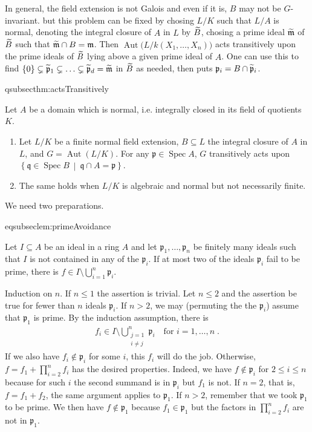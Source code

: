 \documentclass[DIV=14,parskip=full,pointednumbers]{scrartcl}
\newenvironment{alphanumerate}{\begin{enumerate}[label={$(\alph*)$},ref=\curthm]}{\end{enumerate}}
\theoremstyle{cthm}
\theoremstyle{cvarthm}
\renewenvironment{proof}[1][\proofname]
{\pushQED{\qed}\topsep0pt \partopsep0pt\trivlist\item[\hskip\labelsep\itshape #1.] }{\popQED\endtrivlist\addvspace{6pt plus 6pt}}
\theoremstyle{cdef}
\newcommand{\lbl}[1]{
	\label{#1}
	\ifmmode
	\expandafter\xdef\csname eqsubsec#1\endcsname{\thesubsection}
	\fi
}
\newcommand{\mm}{\mathfrak{m}}
\newcommand{\pp}{\mathfrak{p}}
\newcommand{\qq}{\mathfrak{q}}
\newcommand{\Aut}{\operatorname{Aut}}
\newcommand{\Spec}{\operatorname{Spec}}
\newcommand{\snake}[1]{\widetilde{#1}\vphantom{\overrightarrow{#1}}}%
\newcommand{\st}{\ \middle|\ }
\begin{document}
	In general, the field extension is not Galois and even if it is, $B$ may not be $G$-invariant. but this problem can be fixed by chosing $L/K$ such that $L/A$ is normal, denoting the integral closure of $A$ in $L$ by $\snake B$, chosing a prime ideal $\snake\mm$ of $\snake B$ such that $\snake\mm \cap B = \mm$. Then $\Aut\big(L/k(X_1,\ldots,X_n)\big)$ acts transitively upon the prime ideals of $\snake B$ lying above a given prime ideal of $A$. One can use this to find $\{0\}\subsetneq \snake\pp_1\subsetneq \ldots\subsetneq \snake\pp_d = \snake \mm$ in $\snake B$ as needed, then puts $\pp_i= B\cap \snake\pp_i$.

	\begin{thm}\lbl{thm:actsTransitively}
		Let $A$ be a domain which is normal, i.e. integrally closed in its field of quotients $K$. 
		\begin{alphanumerate}
		\item 
			Let $L/K$ be a finite normal field extension, $B\subseteq L$ the integral closure of $A$ in $L$, and $G = \Aut(L/K)$. For any $\pp\in\Spec A$, $G$ transitively acts upon $\left\{\qq\in\Spec B\st \qq\cap A = \pp\right\}$. 
		\item
			The same holds when $L/K$ is algebraic and normal but not necessarily finite.
		\end{alphanumerate}
	\end{thm}
	We need two preparations.
	\begin{lem}\lbl{lem:primeAvoidance}
		Let $I\subseteq A$ be an ideal in a ring $A$ and let $\pp_1,\ldots,\pp_n$ be finitely many ideals such that $I$ is not contained in any of the $\pp_i$. If at most two of the ideals $\pp_i$ fail to be prime, there is $f\in I\setminus\bigcup_{i=1}^n\pp_i$.
	\end{lem}
	\begin{proof}
		Induction on $n$. If $n\leq 1$ the assertion is trivial. Let $n\leq 2$ and the assertion be true for fewer than $n$ ideals $\pp_i$. If $n>2$, we may (permuting the the $\pp_i$) assume that $\pp_1$ is prime. By the induction assumption, there is 
		\begin{align*}
			f_i\in I\setminus \bigcup_{\substack{j = 1\\i\not=j}}^n \pp_i\quad\text{for }i=1,\ldots,n\;. 
		\end{align*}
		If we also have $f_i\not \in \pp_i$ for some $i$, this $f_i$ will do the job. Otherwise, $f= f_1+\prod_{i=2}^nf_i$ has the desired properties. Indeed, we have $f\not\in\pp_i$ for $2\leq i\leq n$ because for such $i$ the second summand is in $\pp_i$ but $f_1$ is not. If $n=2$, that is, $f=f_1+f_2$, the same argument applies to $\pp_1$. If $n>2$, remember that we took $\pp_1$ to be prime. We then have $f\not\in \pp_1$ because $f_1\in\pp_1$ but the factors in $\prod_{i=2}^nf_i$ are not in $\pp_1$.
	\end{proof}
\end{document}
